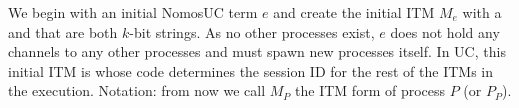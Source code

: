 We begin with an initial NomosUC term $e$ and create the initial ITM $M_e$ with a \sid and \pid that are both $k$-bit strings. As no other processes exist, $e$ does not hold any channels to any other processes and must spawn new processes itself.
In UC, this initial ITM is \Z whose code determines the session ID for the rest of the ITMs in the execution.
Notation: from now we call $M_P$ the ITM form of process $P$ (or $P_P$). 

